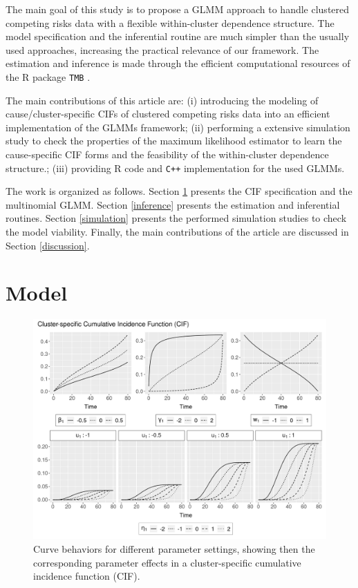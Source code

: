 \documentclass[a4paper,12pt]{article}
\begin{document}
The main goal of this study is to propose a GLMM approach to handle
clustered competing risks data with a flexible within-cluster dependence
structure. The model specification and the inferential routine are much
simpler than the usually used approaches, increasing the practical
relevance of our framework. The estimation and inference is made through
the efficient computational resources of the R \citep{R21} package
\texttt{TMB} \citep{TMb}.

The main contributions of this article are: (i) introducing the modeling
of cause/cluster-specific CIFs of clustered competing risks data into an
efficient implementation of the GLMMs framework; (ii) performing a
extensive simulation study to check the properties of the maximum
likelihood estimator to learn the cause-specific CIF forms and the
feasibility of the within-cluster dependence structure.; (iii) providing
R code and \texttt{C++} implementation for the used GLMMs.

The work is organized as follows. Section \ref{model} presents the CIF
specification and the multinomial GLMM. Section \ref{inference} presents
the estimation and inferential routines. Section \ref{simulation}
presents the performed simulation studies to check the model
viability. Finally, the main contributions of the article are discussed
in Section \ref{discussion}.

\section{Model}
\label{model}

\begin{figure}[H]
 \centering \includegraphics[width=\linewidth]{pics/cifstudy-1.png}
 \vspace{-0.75cm}
 \caption{Curve behaviors for different parameter settings, showing then
   the corresponding parameter effects in a cluster-specific cumulative
   incidence function (CIF).}
 \label{fig:cifcoefs}
\end{figure}
\end{document}
